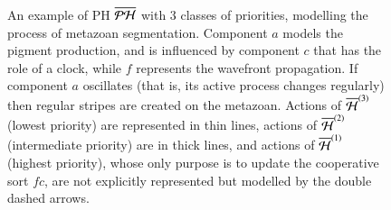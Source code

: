 \begin{figure}[p]
  \centering
  \caption{
  \label{fig:metazoan-php}
    An example of PH $\overline{\mathcal{PH}}$ with $3$ classes of priorities,
    modelling the process of metazoan segmentation.
    Component $a$ models the pigment production, and is influenced by
    component $c$ that has the role of a clock,
    while $f$ represents the wavefront propagation.
    If component $a$ oscillates (that is, its active process changes regularly)
    then regular stripes are created on the metazoan.
    Actions of $\overline{\mathcal{H}}^{(3)}$ (lowest priority) are represented in thin lines,
    actions of $\overline{\mathcal{H}}^{(2)}$ (intermediate priority) are in thick lines,
    and actions of $\overline{\mathcal{H}}^{(1)}$ (highest priority), whose only purpose is to update the cooperative sort $fc$,
    are not explicitly represented but modelled by the double dashed arrows.
  }
\end{figure}

